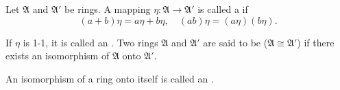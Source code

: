 Let $\mathfrak{A}$ and $\mathfrak{A}'$ be rings. A mapping $\eta: \mathfrak{A} \to \mathfrak{A}'$ is called a  if
$$(a + b)\eta = a\eta + b\eta, \quad (ab)\eta = (a\eta)(b\eta).$$

If $\eta$ is 1-1, it is called an . Two rings $\mathfrak{A}$ and $\mathfrak{A}'$ are said to be  ($\mathfrak{A} \cong \mathfrak{A}'$) if there exists an isomorphism of $\mathfrak{A}$ onto $\mathfrak{A}'$.

An isomorphism of a ring onto itself is called an .
